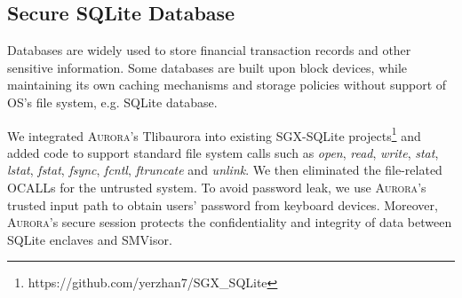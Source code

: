 %
%

\subsection{Secure SQLite Database}
Databases are widely used to store financial transaction records and other sensitive information. Some databases are built upon block devices, while maintaining its own caching mechanisms and storage policies without support of OS's file system, e.g. SQLite database.

We integrated \textsc{Aurora}'s Tlibaurora into existing SGX-SQLite projects\footnote{https://github.com/yerzhan7/SGX\_SQLite} and added code to support standard file system calls such as \textit{open}, \textit{read}, \textit{write}, \textit{stat}, \textit{lstat}, \textit{fstat}, \textit{fsync}, \textit{fcntl}, \textit{ftruncate} and \textit{unlink}. We then eliminated the file-related OCALLs for the untrusted system. 
To avoid password leak, we use \textsc{Aurora}'s trusted input path to obtain users' password from keyboard devices. Moreover, \textsc{Aurora}'s secure session protects the confidentiality and integrity of data between SQLite enclaves and SMVisor.   %

